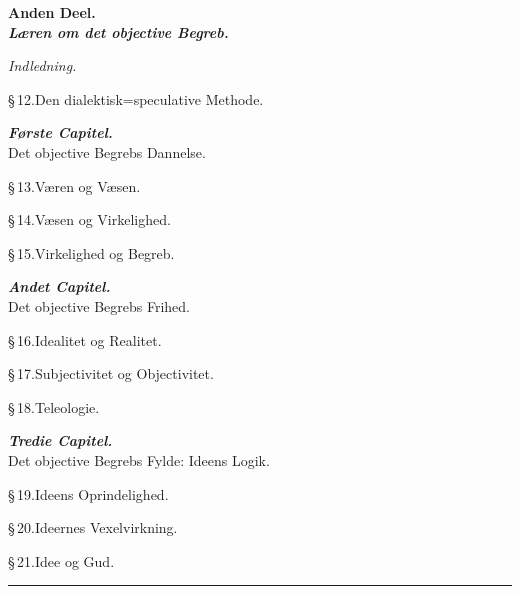 \documentclass[12pt]{book}
\begin{document}
{%
\begin{center}{\bfseries Anden Deel.}\\ {\bfseries\emph{Læren om det objective Begreb.}}\end{center}
\begin{center}\emph{Indledning.}\end{center}
\S\,12.\quad Den dialektisk=speculative Methode.\par

\begin{center}{\bfseries\emph{Første Capitel.}}\\ Det objective Begrebs Dannelse.\end{center}
\S\,13.\quad Væren og Væsen.\par
\S\,14.\quad Væsen og Virkelighed.\par
\S\,15.\quad Virkelighed og Begreb.\par

\begin{center}{\bfseries\emph{Andet Capitel.}}\\ Det objective Begrebs Frihed.\end{center}
\S\,16.\quad Idealitet og Realitet.\par
\S\,17.\quad Subjectivitet og Objectivitet.\par
\S\,18.\quad Teleologie.\par

\begin{center}{\bfseries\emph{Tredie Capitel.}}\\ Det objective Begrebs Fylde: Ideens Logik.\end{center}
\S\,19.\quad Ideens Oprindelighed.\par
\S\,20.\quad Ideernes Vexelvirkning.\par
\S\,21.\quad Idee og Gud.\par

}
\begin{center}\rule{0.35\linewidth}{0.4pt}\end{center}

\cleardoublepage
\tableofcontents

\mainmatter    %

\end{document}
